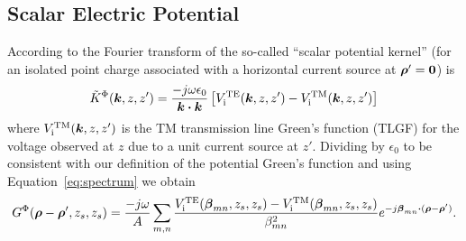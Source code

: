 \subsection{Scalar Electric Potential}
According to \cite{mimo:97} the Fourier transform of the so-called
``scalar potential kernel'' (for an isolated point charge associated
with a horizontal current source at $\boldsymbol{\rho}'
= \boldsymbol{0}$) is
\begin{equation}
  \tilde{K}^{\Phi}(\boldsymbol{k},z,z') = \frac{-j\omega\epsilon_0}{\boldsymbol{k} \boldsymbol{\cdot} \boldsymbol{k}} 
  \left[V_{\text{i}}^{\text{TE}}(\boldsymbol{k},z,z') - V_{\text{i}}^{\text{TM}}(\boldsymbol{k},z,z')\right]
\end{equation}
where $V_{\text{i}}^{\text{TM}}(\boldsymbol{k},z,z')$ is the
TM transmission line Green's function (TLGF) for the voltage observed at
$z$ due to a unit current source at $z'$.  Dividing by $\epsilon_0$
to be consistent with our definition of the potential Green's function
and using Equation~\eqref{eq:spectrum} we obtain
\begin{equation}
  \label{eq:GPhi}
  {G}^{\Phi}(\boldsymbol{\rho}-\boldsymbol{\rho}',z_s,z_s) = \frac{-j\omega}{A} \sum_{m,n}
  \frac{V_{\text{i}}^{\text{TE}}(\boldsymbol{\beta}_{mn},z_s,z_s)-V_{\text{i}}^{\text{TM}}(\boldsymbol{\beta}_{mn},z_s,z_s)}{\beta_{mn}^2}
  e^{-j\boldsymbol{\beta}_{mn} \boldsymbol{\cdot} (\boldsymbol{\rho}-\boldsymbol{\rho}')}.
\end{equation}

